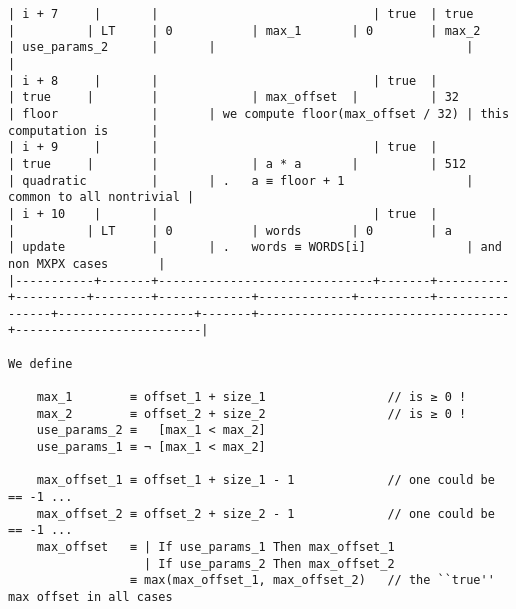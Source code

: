 \documentclass[varwidth=\maxdimen,margin=0.5cm,multi={verbatim}]{standalone}
\begin{document}
\begin{verbatim}
| i + 7     |       |                              | true  | true     |          | LT     | 0           | max_1       | 0        | max_2          | use_params_2      |       |                                   |                          |
| i + 8     |       |                              | true  |          | true     |        |             | max_offset  |          | 32             | floor             |       | we compute floor(max_offset / 32) | this computation is      |
| i + 9     |       |                              | true  |          | true     |        |             | a * a       |          | 512            | quadratic         |       | .   a ≡ floor + 1                 | common to all nontrivial |
| i + 10    |       |                              | true  |          |          | LT     | 0           | words       | 0        | a              | update            |       | .   words ≡ WORDS[i]              | and non MXPX cases       |
|-----------+-------+------------------------------+-------+----------+----------+--------+-------------+-------------+----------+----------------+-------------------+-------+-----------------------------------+--------------------------|

We define

    max_1        ≡ offset_1 + size_1                 // is ≥ 0 !
    max_2        ≡ offset_2 + size_2                 // is ≥ 0 !
    use_params_2 ≡   [max_1 < max_2]
    use_params_1 ≡ ¬ [max_1 < max_2]

    max_offset_1 ≡ offset_1 + size_1 - 1             // one could be == -1 ...
    max_offset_2 ≡ offset_2 + size_2 - 1             // one could be == -1 ...
    max_offset   ≡ | If use_params_1 Then max_offset_1
                   | If use_params_2 Then max_offset_2
                 ≡ max(max_offset_1, max_offset_2)   // the ``true'' max offset in all cases

\end{verbatim}
\end{document}
